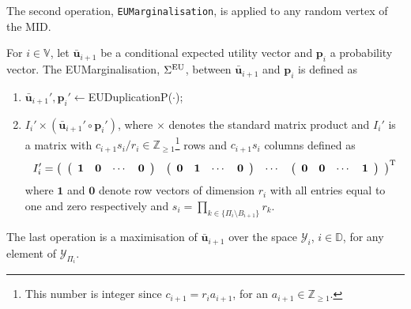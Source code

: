 The second operation, \texttt{EUMarginalisation}, is applied to any random vertex of the MID.
\begin{definition}[EUMarginalisation]
\label{EU-Marginalization}
For $i\in\mathbb{V}$, let $\bar{\bm{u}}_{i+1}$ be a conditional expected utility vector and $\bm{p}_i$ a probability vector. The EUMarginalisation, $\Sigma^{\textnormal{EU}}$, between $\bar{\bm{u}}_{i+1}$ and $\bm{p}_i$ is defined as
\begin{enumerate}
\item $\bar{\bm{u}}_{i+1}',\bm{p}_i'\longleftarrow$EUDuplicationP($\cdot$);
\item $I_i'\times (\bar{\bm{u}}_{i+1}'\circ\bm{p}_i')$, where $\times$ denotes the standard matrix product and $I_i'$ is a matrix with $c_{i+1}s_i/r_i\in\mathbb{Z}_{\geq 1}$\footnote{This number is integer since $c_{i+1}=r_ia_{i+1}$, for an $a_{i+1}\in\mathbb{Z}_{\geq 1}$.} rows and $c_{i+1}s_i$ columns defined as 
\[
I_i'=\left(\begin{array}{cccc}
\left(
\begin{array}{cccc}
\bm{1}&\bm{0}&\cdots&\bm{0}
\end{array}
\right)
&\left(
\begin{array}{cccc}
\bm{0}&\bm{1}&\cdots&\bm{0}
\end{array}
\right)&
\cdots&
\left(
\begin{array}{cccc}
\bm{0}&\bm{0}&\cdots&\bm{1}
\end{array}
\right)
\end{array}
\right)^{\textnormal{T}}
\]
where $\bm{1}$ and $\bm{0}$ denote row vectors of dimension $r_i$ with all entries equal to one and zero respectively and $s_i=\prod_{k\in \{\Pi_i\setminus B_{i+1}\}}r_k$.
\end{enumerate}
\end{definition}

The last operation is a maximisation of $\bar{\bm{u}}_{i+1}$ over the space $\mathcal{Y}_i$, $i\in \mathbb{D}$, for any element of $\bm{\mathcal{Y}}_{\Pi_i}$.

